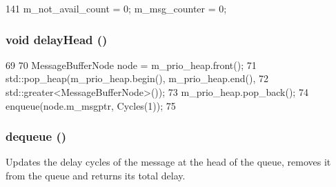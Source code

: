 \begin{DoxyCode}
141 { m_not_avail_count = 0; m_msg_counter = 0; }
\end{DoxyCode}
\hypertarget{classMessageBuffer_ae20106ccbc4569ff9474570932956f7f}{
\subsubsection[{delayHead}]{\setlength{\rightskip}{0pt plus 5cm}void delayHead ()}}
\label{classMessageBuffer_ae20106ccbc4569ff9474570932956f7f}



\begin{DoxyCode}
69     {
70         MessageBufferNode node = m_prio_heap.front();
71         std::pop_heap(m_prio_heap.begin(), m_prio_heap.end(),
72                       std::greater<MessageBufferNode>());
73         m_prio_heap.pop_back();
74         enqueue(node.m_msgptr, Cycles(1));
75     }
\end{DoxyCode}
\hypertarget{classMessageBuffer_af900ed471b929eca9aa2649b378086ba}{
\subsubsection[{dequeue}]{ dequeue ()}}
\label{classMessageBuffer_af900ed471b929eca9aa2649b378086ba}
Updates the delay cycles of the message at the head of the queue, removes it from the queue and returns its total delay. 


